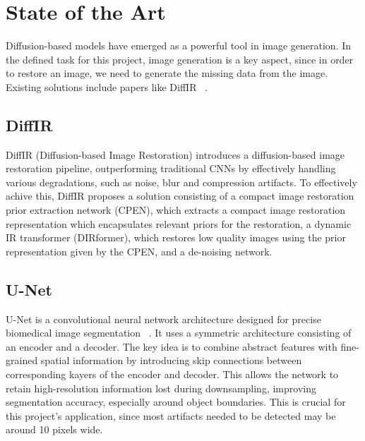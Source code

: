 \documentclass[openany, 12pt]{article}
\begin{document}
	\section{State of the Art}
	{\color{blue}
	Diffusion-based models have emerged as a powerful tool in image generation. In the defined task for this project, image generation is a key aspect, since in order to restore an image, we need to generate the missing data from the image. 
	Existing solutions include papers like DiffIR ~\cite{xia_diffir_2023}.}
	
	\subsection{DiffIR}
	{\color{blue}
	DiffIR (Diffusion-based Image Restoration) introduces a diffusion-based image restoration pipeline, outperforming traditional CNNs by effectively handling various degradations, such as noise, blur and compression artifacts. To effectively achive this, DiffIR proposes a solution consisting of a compact image restoration prior extraction network (CPEN), which extracts a compact image restoration representation which encapsulates relevant priors for the restoration, a dynamic IR transformer (DIRformer), which restores low quality images using the prior representation given by the CPEN, and a de-noising network. 
	\subsection{U-Net}
	U-Net is a convolutional neural network architecture designed for precise biomedical image segmentation  ~\cite{ronneberger_u-net_2015}. It uses a symmetric architecture consisting of an encoder and a decoder. The key idea is to combine abstract features with fine-grained spatial information by introducing skip connections between corresponding kayers of the encoder and decoder. This allows the network to retain high-resolution information lost during downsampling, improving segmentation accuracy, especially around object boundaries. This is crucial for this project's application, since most artifacts needed to be detected may be around 10 pixels wide. \\
}
\end{document}
